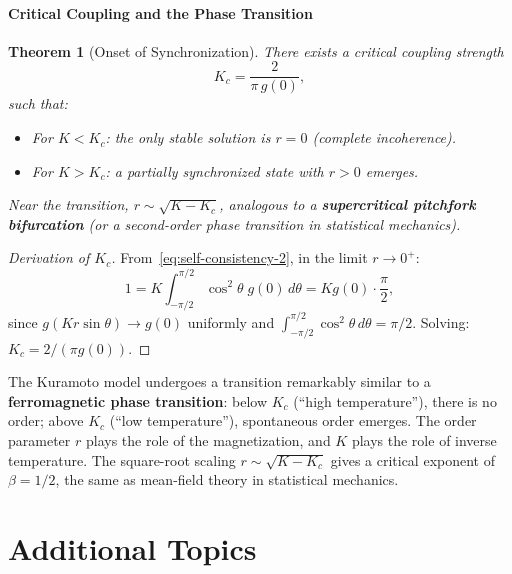 \documentclass[11pt,letterpaper]{article}
\theoremstyle{definition}
\theoremstyle{plain}
\newtheorem{theorem}{Theorem}[section]
\theoremstyle{remark}
\begin{document}
\subsection{Critical Coupling and the Phase Transition}

\begin{theorem}[Onset of Synchronization]
There exists a critical coupling strength
\begin{equation}\label{eq:Kc}
  K_c = \frac{2}{\pi\, g(0)},
\end{equation}
such that:
\begin{itemize}[leftmargin=2em]
\item For $K < K_c$: the only stable solution is $r = 0$
      (complete incoherence).
\item For $K > K_c$: a partially synchronized state with $r > 0$
      emerges.
\end{itemize}
Near the transition, $r \sim \sqrt{K - K_c}$, analogous to a
\textbf{supercritical pitchfork bifurcation} (or a second-order phase
transition in statistical mechanics).
\end{theorem}

\begin{proof}[Derivation of $K_c$]
From~\eqref{eq:self-consistency-2}, in the limit $r\to 0^+$:
\[
  1 = K\int_{-\pi/2}^{\pi/2}\cos^2\theta\;g(0)\,d\theta
  = Kg(0)\cdot\frac{\pi}{2},
\]
since $g(Kr\sin\theta)\to g(0)$ uniformly and
$\int_{-\pi/2}^{\pi/2}\cos^2\theta\,d\theta = \pi/2$.
Solving: $K_c = 2/(\pi g(0))$.
\end{proof}

\begin{physicalnote}
The Kuramoto model undergoes a transition remarkably similar to a
\textbf{ferromagnetic phase transition}: below $K_c$ (``high temperature''),
there is no order; above $K_c$ (``low temperature''), spontaneous order
emerges.  The order parameter $r$ plays the role of the magnetization, and
$K$ plays the role of inverse temperature.  The square-root scaling
$r\sim\sqrt{K-K_c}$ gives a critical exponent of $\beta = 1/2$, the same
as mean-field theory in statistical mechanics.
\end{physicalnote}


\part{Additional Topics}
\end{document}
